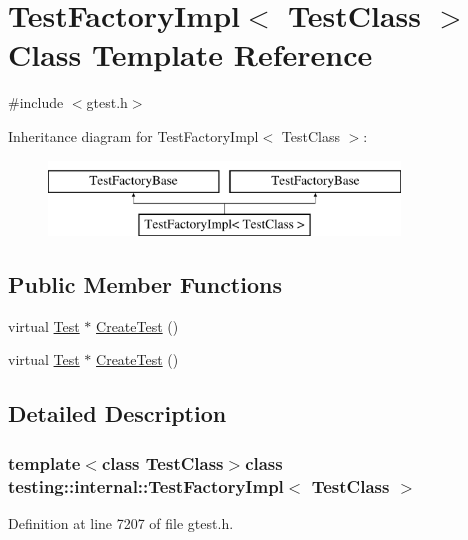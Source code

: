 \hypertarget{classtesting_1_1internal_1_1TestFactoryImpl}{\section{\-Test\-Factory\-Impl$<$ \-Test\-Class $>$ \-Class \-Template \-Reference}
\label{d0/d88/classtesting_1_1internal_1_1TestFactoryImpl}
}


{\ttfamily \#include $<$gtest.\-h$>$}

\-Inheritance diagram for \-Test\-Factory\-Impl$<$ \-Test\-Class $>$\-:\begin{figure}[H]
\begin{center}
\leavevmode
\includegraphics[height=2.000000cm]{d0/d88/classtesting_1_1internal_1_1TestFactoryImpl}
\end{center}
\end{figure}
\subsection*{\-Public \-Member \-Functions}
\begin{DoxyCompactItemize}
\item 
virtual \hyperlink{classtesting_1_1Test}{\-Test} $\ast$ \hyperlink{classtesting_1_1internal_1_1TestFactoryImpl_a0c8d3cb7d986c562f4b2913a2650e3e0}{\-Create\-Test} ()
\item 
virtual \hyperlink{classtesting_1_1Test}{\-Test} $\ast$ \hyperlink{classtesting_1_1internal_1_1TestFactoryImpl_a0c8d3cb7d986c562f4b2913a2650e3e0}{\-Create\-Test} ()
\end{DoxyCompactItemize}


\subsection{\-Detailed \-Description}
\subsubsection*{template$<$class Test\-Class$>$class testing\-::internal\-::\-Test\-Factory\-Impl$<$ Test\-Class $>$}



\-Definition at line 7207 of file gtest.\-h.



